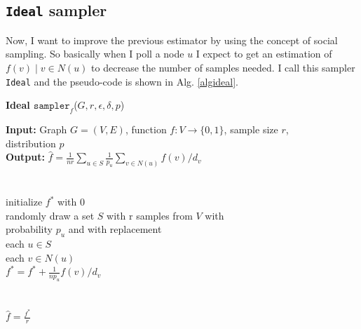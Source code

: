 \subsection{\texttt{Ideal} sampler}
\label{algorithmideal}
Now, I want to improve the previous estimator by using the concept of social sampling. So basically when I poll a node $u$ I expect to get an estimation of ${f(v)\;|\;v \in N(u)}$ to decrease the number of samples needed.
I call this sampler \texttt{Ideal}\cite{dasgupta2012social} and the pseudo-code is shown in Alg. \ref{algideal}.
\begin{algorithm*}[!htb]
\caption{\small {\bf Ideal $\texttt{sampler}_f$}($G, r, \epsilon, \delta, p$)}
\begin{code}
{\bf Input:} Graph $G=(V,E)$, function $f : V \rightarrow \{0,1\}$, sample size $r$,\\ distribution $p$ \\
{\bf Output:} $\hat{f}=\frac{1}{nr}\sum\nolimits_{u\in S}\frac{1}{p_u}\sum\nolimits_{v\in N(u)} f(v)/d_v$\\
\\
\uln \>\ubegin\\
\uln \>\>initialize $f^*$ with 0 \\
\uln \>\>randomly draw a set $S$ with r samples from $V$ with\\
\>   \>\>\>probability $p_u$ and with replacement\\
\uln \>\>\ufor each $u \in S$ \udo\\
\uln \>\>\>\ufor each $v \in N(u)$ \udo\\
\uln \>\>\>\>$f^* = f^* + \frac{1}{n p_u}f(v)/d_v$ \\
\uln \>\>\>\uend\\
\uln \>\>\uend\\
\uln \>\ureturn $\hat{f} = \frac{f^*}{r}$ \\
\uln \>\uend\\ 
\end{code}
\label{algideal}
\end{algorithm*}


